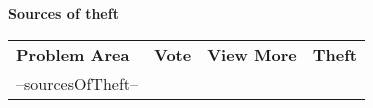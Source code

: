 \documentclass{article}
\begin{document}
\textcolor{primary}{\huge \textbf{Sources of theft}}
\setlength{\tabcolsep}{10pt} %
{\renewcommand{\arraystretch}{2}%
\begin{longtable}{p{150pt} p{100pt} p{100pt} p{100pt}} 
    \cellcolor{tableHeaderBg} \textbf{Problem Area} &
    \cellcolor{tableHeaderBg} \textbf{Vote} &
    \cellcolor{tableHeaderBg} \textbf{View More} &
    \cellcolor{tableHeaderBg} \textbf{Theft} \\ 

    --sourcesOfTheft--
\end{longtable}
}
\end{document}

